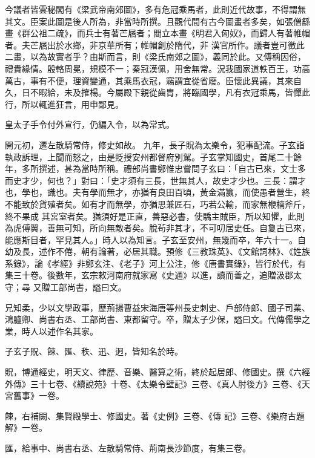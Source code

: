 \begin{pinyinscope}
 今議者皆雲秘閣有《梁武帝南郊圖》，多有危冠乘馬者，此則近代故事，不得謂無其文。臣案此圖是後人所為，非當時所撰。且觀代間有古今圖畫者多矣，如張僧繇畫《群公祖二疏》，而兵士有著芒屩者；閻立本畫《明君入匈奴》，而歸人有著帷帽者。夫芒屩出於水鄉，非京華所有；帷帽創於隋代，非
 漢官所作。議者豈可徵此二畫，以為故實者乎？由斯而言，則《梁氏南郊之圖》，義同於此。又傅稱因俗，禮貴緣情。殷輅周冕，規模不一；秦冠漢佩，用舍無常。況我國家道軼百王，功高萬古，事有不便，理資變通，其乘馬衣冠，竊謂宜從省廢。臣懷此異議，其來自久，日不暇給，未及搉楊。今屬殿下親從齒胄，將臨國學，凡有衣冠乘馬，皆憚此行，所以輒進狂言，用申鄙見。



 皇太子手令付外宣行，仍編入令，以為常式。



 開元初，遷左散騎常侍，修史如故。
 九年，長子貺為太樂令，犯事配流。子玄詣執政訴理，上聞而怒之，由是貶授安州都督府別駕。子玄掌知國史，首尾二十餘年，多所撰述，甚為當時所稱。禮部尚書鄭惟忠嘗問子玄曰：「自古已來，文士多而史才少，何也？」對曰：「史才須有三長，世無其人，故史才少也。三長：謂才也，學也，識也。夫有學而無才，亦猶有良田百頃，黃金滿籝，而使愚者營生，終不能致於貨殖者矣。如有才而無學，亦猶思兼匠石，巧若公輸，而家無楩楠斧斤，終不果成
 其宮室者矣。猶須好是正直，善惡必書，使驕主賊臣，所以知懼，此則為虎傅翼，善無可知，所向無敵者矣。脫茍非其才，不可叨居史任。自夐古已來，能應斯目者，罕見其人。」時人以為知言。子玄至安州，無幾而卒，年六十一。自幼及長，述作不倦，朝有論著，必居其職。預修《三教珠英》、《文館詞林》、《姓族系錄》，論《孝經》非鄭玄注、《老子》河上公注，修《唐書實錄》，皆行於代，有集三十卷。後數年，玄宗敕河南府就家寫《史通》以進，讀而善之，追贈汲郡太守；尋
 又贈工部尚書，謚曰文。



 兄知柔，少以文學政事，歷荊揚曹益宋海唐等州長史刺史、戶部侍郎、國子司業、鴻臚卿、尚書右丞、工部尚書、東都留守。卒，贈太子少保，謚曰文。代傳儒學之業，時人以述作名其家。



 子玄子貺、餗、匯、秩、迅、迥，皆知名於時。



 貺，博通經史，明天文、律歷、音樂、醫算之術，終於起居郎、修國史。撰《六經外傳》三十七卷、《續說苑》十卷、《太樂令壁記》三卷、《真人肘後方》三卷、《天宮舊事》一卷。



 餗，右補闕、集賢殿學士、修國史。著《史例》三卷、《傳
 記》三卷、《樂府古題解》一卷。



 匯，給事中、尚書右丞、左散騎常侍、荊南長沙節度，有集三卷。




\end{pinyinscope}
